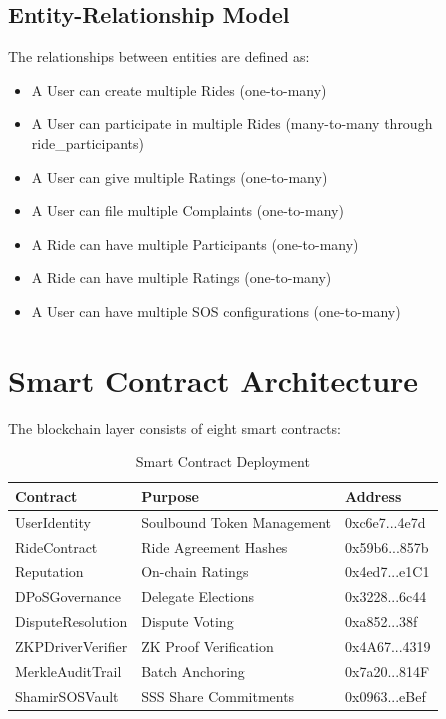 \subsection{Entity-Relationship Model}

The relationships between entities are defined as:

\begin{itemize}
    \item A User can create multiple Rides (one-to-many)
    \item A User can participate in multiple Rides (many-to-many through ride\_participants)
    \item A User can give multiple Ratings (one-to-many)
    \item A User can file multiple Complaints (one-to-many)
    \item A Ride can have multiple Participants (one-to-many)
    \item A Ride can have multiple Ratings (one-to-many)
    \item A User can have multiple SOS configurations (one-to-many)
\end{itemize}

\section{Smart Contract Architecture}

The blockchain layer consists of eight smart contracts:

\begin{table}[H]
\centering
\caption{Smart Contract Deployment}
\begin{tabular}{|l|l|l|}
\hline
\textbf{Contract} & \textbf{Purpose} & \textbf{Address} \\
\hline
UserIdentity & Soulbound Token Management & 0xc6e7...4e7d \\
RideContract & Ride Agreement Hashes & 0x59b6...857b \\
Reputation & On-chain Ratings & 0x4ed7...e1C1 \\
DPoSGovernance & Delegate Elections & 0x3228...6c44 \\
DisputeResolution & Dispute Voting & 0xa852...38f \\
ZKPDriverVerifier & ZK Proof Verification & 0x4A67...4319 \\
MerkleAuditTrail & Batch Anchoring & 0x7a20...814F \\
ShamirSOSVault & SSS Share Commitments & 0x0963...eBef \\
\hline
\end{tabular}
\end{table}

